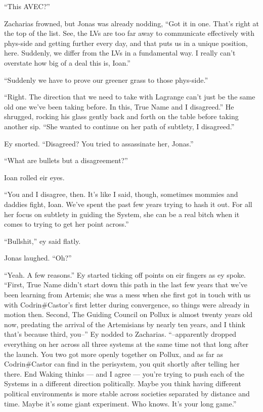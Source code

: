 ``This AVEC?''

Zacharias frowned, but Jonas was already nodding, ``Got it in one. That's right at the top of the list. See, the LVs are too far away to communicate effectively with phys-side and getting further every day, and that puts us in a unique position, here. Suddenly, we differ from the LVs in a fundamental way. I really can't overstate how big of a deal this is, Ioan.''

``Suddenly we have to prove our greener grass to those phys-side.''

``Right. The direction that we need to take with Lagrange can't just be the same old one we've been taking before. In this, True Name and I disagreed.'' He shrugged, rocking his glass gently back and forth on the table before taking another sip. ``She wanted to continue on her path of subtlety, I disagreed.''

Ey snorted. ``Disagreed? You tried to assassinate her, Jonas.''

``What are bullets but a disagreement?''

Ioan rolled eir eyes.

``You and I disagree, then. It's like I said, though, sometimes mommies and daddies fight, Ioan. We've spent the past few years trying to hash it out. For all her focus on subtlety in guiding the System, she can be a real bitch when it comes to trying to get her point across.''

``Bullshit,'' ey said flatly.

Jonas laughed. ``Oh?''

``Yeah. A few reasons.'' Ey started ticking off points on eir fingers as ey spoke. ``First, True Name didn't start down this path in the last few years that we've been learning from Artemis; she was a mess when she first got in touch with us with Codrin\#Castor's first letter during convergence, so things were already in motion then. Second, The Guiding Council on Pollux is almost twenty years old now, predating the arrival of the Artemisians by nearly ten years, and I think that's because third, you--'' Ey nodded to Zacharias. ``--apparently dropped everything on her across all three systems at the same time not that long after the launch. You two got more openly together on Pollux, and as far as Codrin\#Castor can find in the perisystem, you quit shortly after telling her there. End Waking thinks — and I agree — you're trying to push each of the Systems in a different direction politically. Maybe you think having different political environments is more stable across societies separated by distance and time. Maybe it's some giant experiment. Who knows. It's your long game.''

